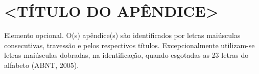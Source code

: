 \chapter{<T\'ITULO DO AP\^ENDICE>}
\label{apend}


Elemento opcional. O(s) apêndice(s) são identificados por letras maiúsculas consecutivas, travessão e pelos respectivos títulos. Excepcionalmente utilizam-se letras maiúsculas dobradas, na identificação, quando esgotadas as 23 letras do alfabeto (ABNT, 2005).
